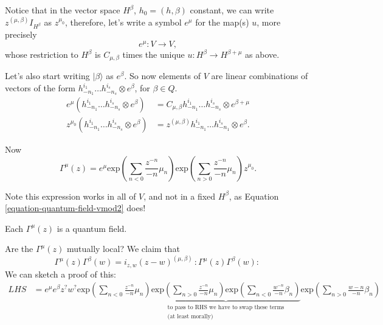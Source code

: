 \medskip\noindent
Notice that in the vector space 
$H^\beta$, $h_0=(h,\beta)$ constant, we can write
$z^{(\mu,\beta)}I_{H^\beta}$ as $z^{\mu_0}$,
therefore, let's write a symbol $e^\mu$ for the map(s) $u$,
more precisely
$$
e^\mu:V \to V,
$$
whose restriction to $H^\beta$ is $C_{\mu,\beta}$ times
the unique $u:H^\beta \to H^{\beta+\mu}$ as above.

Let's also start writing
$|\beta\rangle$ as $e^\beta$.
So now elements of $V$ are linear combinations
of vectors of the form
$h^{i_1}_{-n_1}\ldots h^{i_s}_{-n_s} \otimes e^\beta$,
for $\beta \in Q$.
\begin{align*}
e^\mu(h^{i_1}_{-n_1}\ldots h^{i_s}_{-n_s} \otimes e^\beta)
&=C_{\mu,\beta} h^{i_1}_{-n_1}\ldots h^{i_s}_{-n_s}\otimes e^{\beta+\mu}\\
z^{\mu_0}(h^{i_1}_{-n_1}\ldots h^{i_s}_{-n_s}\otimes e^\beta)
&=z^{(\mu,\beta)}h^{i_1}_{-n_1}\ldots h^{i_s}_{-n_1} \otimes e^\beta.
\end{align*}

\noindent
Now
\begin{equation}
\label{equation-quantum-field-vmod3}
\Gamma^\mu(z)=e^\mu 
\text{exp}\left(\sum_{n<0}\frac{z^{-n}}{-n}\mu_n\right)
\text{exp}\left(\sum_{n>0}\frac{z^{-n}}{-n}\mu_n\right)
z^{\mu_0}.
\end{equation}

\noindent
Note this expression works in all of $V$,
and not in a fixed $H^\beta$, as Equation \ref{equation-quantum-field-vmod2}
does!

\begin{exercise}
\label{exercise-quantum-field-vmod}
Each $\Gamma^\mu(z)$ is a quantum field.
\end{exercise}

\noindent
Are the $\Gamma^\mu(z)$ mutually local?
We claim that
\begin{equation}
\label{equation-mutually-local-vmode}
\Gamma^\mu(z)\Gamma^\beta(w)=
i_{z,w}(z-w)^{(\mu,\beta)}\,:\!\Gamma^\mu(z)\Gamma^\beta(w)\!:\,
\end{equation}
We can sketch a proof of this:
\begin{align*}
LHS&=e^\mu e^\beta z^? w^?
\text{exp}\left(\sum_{n<0}\frac{z^{-n}}{-n}\mu_n\right)
\underbrace{\text{exp}\left(\sum_{n>0}\frac{z^{-n}}{-n}\mu_n\right)
\text{exp}\left(\sum_{n<0}\frac{w^{-n}}{-n}\beta_n\right)
}_{\substack{\text{to pass to RHS we have to swap these terms}\\
\text{(at least morally)}}}
\text{exp}\left(\sum_{n>0}\frac{w-n}{-n}\beta_n\right)
\end{align*}

